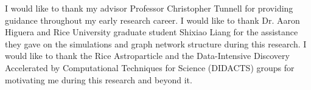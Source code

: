 \documentclass[../thesis.tex]{subfiles}
\begin{document}
I would like to thank my advisor Professor Christopher Tunnell for providing guidance throughout my early research career.
I would like to thank Dr. Aaron Higuera and Rice University graduate student Shixiao Liang for the assistance they gave on the simulations and graph network structure during this research.
I would like to thank the Rice Astroparticle and the Data-Intensive Discovery Accelerated by Computational Techniques for Science (DIDACTS) groups for motivating me during this research and beyond it.
\end{document}
